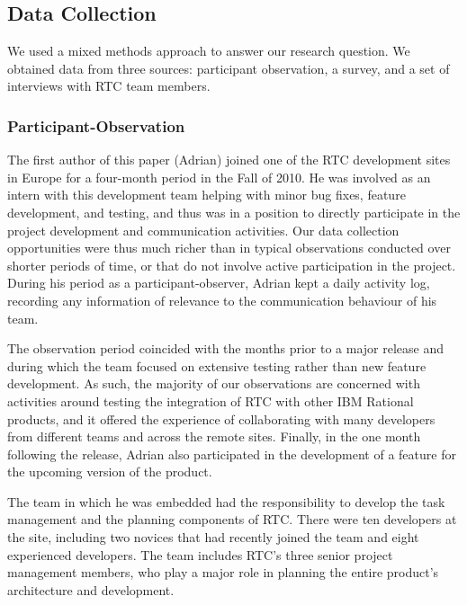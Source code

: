 \subsection{Data Collection}

We used a mixed methods approach to answer our research question. We obtained data from three sources: participant observation, a survey, and a set of interviews with RTC team members.

\subsubsection{Participant-Observation}

The first author of this paper (Adrian) joined one of the RTC development sites in Europe for a four-month period in the Fall of 2010. He was involved as an intern with this development team helping with minor bug fixes, feature development, and testing, and thus was in a position to directly participate in the project development and communication activities. Our data collection opportunities were thus much richer than in typical observations conducted over shorter periods of time, or that do not involve active participation in the project.  During his period as a participant-observer, Adrian kept a daily activity log, recording any information of relevance to the communication behaviour of his team.

The observation period coincided with the months prior to a major release and during which the team focused on extensive testing rather than new feature development. As such, the majority of our observations are concerned with activities around testing the integration of RTC with other IBM Rational products, and it offered the experience of collaborating with many developers from different teams and across the remote sites. Finally, in the one month following the release, Adrian also participated in the development of a feature for the upcoming version of the product.

The team in which he was embedded had the responsibility to develop the task management and the planning components of RTC. There were ten developers at the site, including two novices that had recently joined the team and eight experienced developers. The team includes RTC's three senior project management members, who play a major role in planning the entire product's architecture and development.

